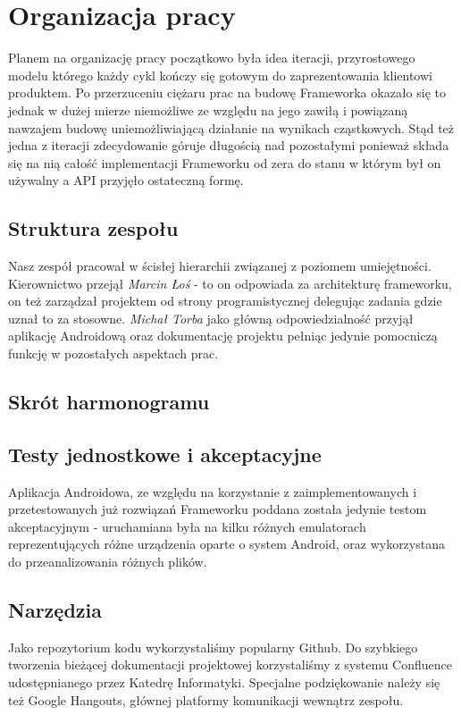 \chapter{Organizacja pracy}
Planem na organizację pracy początkowo była idea iteracji, przyrostowego modelu którego każdy cykl kończy się gotowym do zaprezentowania klientowi produktem. Po przerzuceniu ciężaru prac na budowę Frameworka okazało się to jednak w dużej mierze niemożliwe ze względu na jego zawiłą i powiązaną nawzajem budowę uniemożliwiającą działanie na wynikach cząstkowych. Stąd też jedna z iteracji zdecydowanie góruje długością nad pozostałymi ponieważ składa się na nią całość implementacji Frameworku od zera do stanu w którym był on używalny a API przyjęło ostateczną formę.

\section{Struktura zespołu}
Nasz zespół pracował w ścisłej hierarchii związanej z poziomem umiejętności. Kierownictwo przejął \emph{Marcin Łoś} - to on odpowiada za architekturę frameworku, on też zarządzał projektem od strony programistycznej delegując zadania gdzie uznał to za stosowne. \emph{Michał Torba} jako główną odpowiedzialność przyjął aplikację Androidową oraz dokumentację projektu pełniąc jedynie pomocniczą funkcję w pozostałych aspektach prac.
\section{Skrót harmonogramu}
\section{Testy jednostkowe i akceptacyjne}




Aplikacja Androidowa, ze względu na korzystanie z zaimplementowanych i przetestowanych już rozwiązań Frameworku poddana została jedynie testom akceptacyjnym - uruchamiana była na kilku różnych emulatorach reprezentujących różne urządzenia oparte o system Android, oraz wykorzystana do przeanalizowania różnych plików.
\section{Narzędzia}
Jako repozytorium kodu wykorzystaliśmy popularny Github. Do szybkiego tworzenia bieżącej dokumentacji projektowej korzystaliśmy z systemu Confluence udostępnianego przez Katedrę Informatyki. Specjalne podziękowanie należy się też Google Hangouts, głównej platformy komunikacji wewnątrz zespołu.

